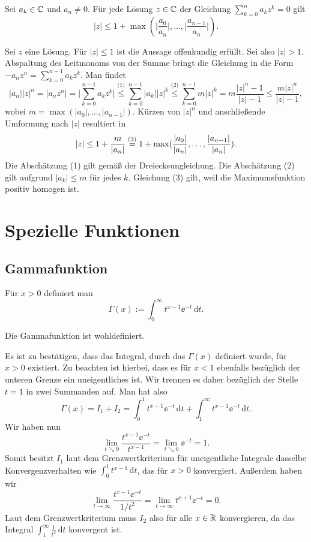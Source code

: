 \begin{Satz}%
\newlinefirst
Sei $a_k\in\mathbb C$ und $a_n\ne 0$. Für jede Lösung $z\in\mathbb C$ der Gleichung
$\sum_{k=0}^n a_k z^k = 0$ gilt%
\[|z| \le 1 + \max(\bigg|\frac{a_0}{a_n}\bigg|,\ldots,\bigg|\frac{a_{n-1}}{a_n}\bigg|).\]
\end{Satz}
\begin{Beweis}
Sei $z$ eine Lösung. Für $|z|\le 1$ ist die Aussage offenkundig
erfüllt. Sei also $|z|>1$. Abspaltung des Leitmonoms von der Summe
bringt die Gleichung in die Form $-a_n z^n = \sum_{k=0}^{n-1} a_k z^k$.
Man findet
\[|a_n| |z|^n = |a_n z^n| = \bigg|\sum_{k=0}^{n-1} a_k z^k\bigg|
\stackrel{\text{(1)}} \le \sum_{k=0}^{n-1} |a_k| |z|^k
\stackrel{\text{(2)}} \le \sum_{k=0}^{n-1} m |z|^k
= m\frac{|z|^n-1}{|z|-1} \le \frac{m|z|^n}{|z|-1},\]
wobei $m=\max(|a_0|,\ldots,|a_{n-1}|)$. Kürzen von $|z|^n$ und
anschließende Umformung nach $|z|$ resultiert in
\[|z| \le 1 + \frac{m}{|a_n|} \stackrel{\text(3)}=
1 + \max(\frac{|a_0|}{|a_n|},\ldots,\frac{|a_{n-1}|}{|a_n|}).\]
Die Abschätzung (1) gilt gemäß der Dreiecksungleichung. Die
Abschätzung (2) gilt aufgrund $|a_k|\le m$ für jedes $k$. Gleichung
(3) gilt, weil die Maximumsfunktion positiv homogen ist.\,\qedsymbol
\end{Beweis}

\newpage
\section{Spezielle Funktionen}
\subsection{Gammafunktion}

\begin{Definition}[Gammafunktion]
Für $x>0$ definiert man
\[\Gamma(x) := \int_0^\infty t^{x-1}\ee^{-t}\,\mathrm dt.\]
\end{Definition}

\begin{Satz}
Die Gammafunktion ist wohldefiniert.
\end{Satz}
\begin{Beweis}
Es ist zu bestätigen, dass das Integral, durch das $\Gamma(x)$ definiert
wurde, für $x>0$ existiert. Zu beachten ist hierbei, dass es
für $x<1$ ebenfalls bezüglich der unteren Grenze ein uneigentliches ist.
Wir trennen es daher bezüglich der Stelle $t=1$ in zwei Summanden auf.
Man hat also
\[\Gamma(x) = I_1 + I_2 = \int_0^1 t^{x-1}\ee^{-t}\,\mathrm dt +
\int_1^\infty t^{x-1}\ee^{-t}\,\mathrm dt.\]
Wir haben nun
\[\lim_{t\searrow 0} \frac{t^{x-1}\ee^{-t}}{t^{x-1}}
= \lim_{t\searrow 0}\ee^{-t} = 1.\]
Somit besitzt $I_1$ laut dem
Grenzwertkriterium für uneigentliche Integrale dasselbe
Konvergenzverhalten wie $\int_0^1 t^{x-1}\,\mathrm dt$, das für
$x>0$ konvergiert. Außerdem haben wir
\[\lim_{t\to\infty}\frac{t^{x-1}\ee^{-t}}{1/t^2}
= \lim_{t\to\infty} t^{x+1}\ee^{-t} = 0.\]
Laut dem Grenzwertkriterium muss $I_2$ also für alle $x\in\mathbb R$
konvergieren, da das Integral $\int_1^\infty \frac{1}{t^2}\,\mathrm dt$
konvergent ist.\,\qedsymbol
\end{Beweis}

